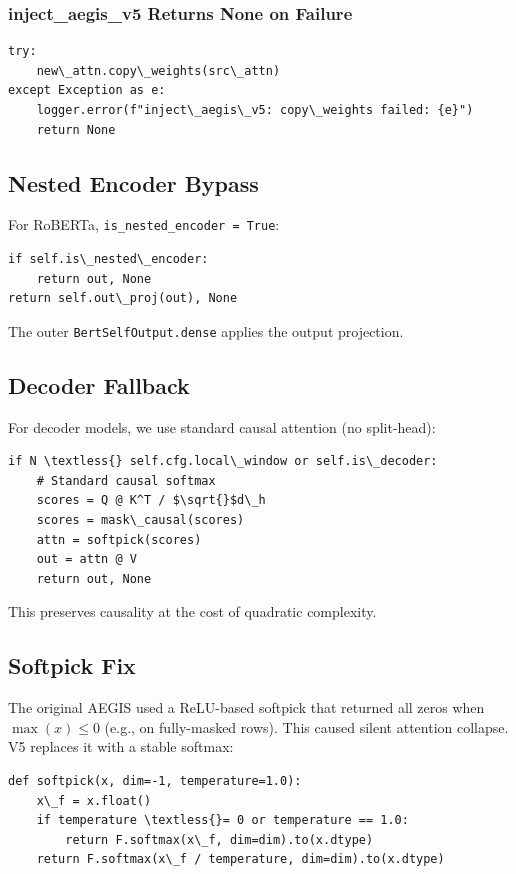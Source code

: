 \subsubsection{inject\_aegis\_v5 Returns None on Failure}

\begin{lstlisting}
try:
    new\_attn.copy\_weights(src\_attn)
except Exception as e:
    logger.error(f"inject\_aegis\_v5: copy\_weights failed: {e}")
    return None
\end{lstlisting}

\subsection{Nested Encoder Bypass}

For RoBERTa, \texttt{is\_nested\_encoder = True}:

\begin{lstlisting}
if self.is\_nested\_encoder:
    return out, None
return self.out\_proj(out), None
\end{lstlisting}

The outer \texttt{BertSelfOutput.dense} applies the output projection.

\subsection{Decoder Fallback}

For decoder models, we use standard causal attention (no split-head):

\begin{lstlisting}
if N \textless{} self.cfg.local\_window or self.is\_decoder:
    # Standard causal softmax
    scores = Q @ K^T / $\sqrt{}$d\_h
    scores = mask\_causal(scores)
    attn = softpick(scores)
    out = attn @ V
    return out, None
\end{lstlisting}

This preserves causality at the cost of quadratic complexity.

\subsection{Softpick Fix}

The original AEGIS used a ReLU-based softpick that returned all zeros when 
$\max(x) \leq 0$ (e.g., on fully-masked rows). This caused silent attention 
collapse. V5 replaces it with a stable softmax:

\begin{lstlisting}
def softpick(x, dim=-1, temperature=1.0):
    x\_f = x.float()
    if temperature \textless{}= 0 or temperature == 1.0:
        return F.softmax(x\_f, dim=dim).to(x.dtype)
    return F.softmax(x\_f / temperature, dim=dim).to(x.dtype)
\end{lstlisting}

